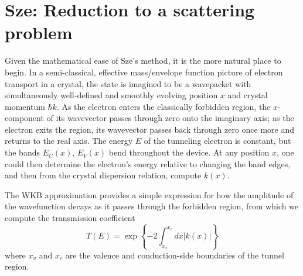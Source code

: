 \section{Sze: Reduction to a scattering problem}
Given the mathematical ease of Sze's method, it is the more natural place to begin. In a semi-classical, effective mass/envelope function picture of electron transport in a crystal, the state is imagined to be a wavepacket with simultaneously well-defined and smoothly evolving position $x$ and crystal momentum $\hbar k$.  As the electron enters the classically forbidden region, the $x$-component of its wavevector passes through zero onto the imaginary axis; as the electron exits the region, its wavevector passes back through zero once more and returns to the real axis.  The energy $E$ of the tunneling electron is constant, but the bands $E_C(x)$, $E_V(x)$ bend throughout the device.  At any position $x$, one could then determine the electron's energy relative to changing the band edges, and then from the crystal dispersion relation, compute $k(x)$.

The WKB approximation provides a simple expression for how the amplitude of the wavefunction decays as it passes through the forbidden region, from which we compute the transmission coefficient
$$T(E)=\exp\left\{-2\int_{x_v}^{x_c}dx|k(x)|\right\}$$
where $x_v$ and $x_c$ are the valence and conduction-side boundaries of the tunnel region.